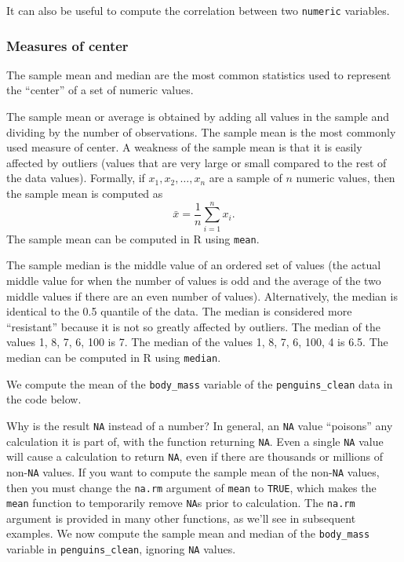 \documentclass[
]{book}
\newenvironment{Shaded}{\begin{snugshade}}{\end{snugshade}}
\newcommand{\DocumentationTok}[1]{\textcolor[rgb]{0.56,0.35,0.01}{\textbf{\textit{#1}}}}
\newcommand{\FunctionTok}[1]{\textcolor[rgb]{0.00,0.00,0.00}{#1}}
\newcommand{\NormalTok}[1]{#1}
\newcommand{\SpecialCharTok}[1]{\textcolor[rgb]{0.00,0.00,0.00}{#1}}
\theoremstyle{definition}
\theoremstyle{definition}
\theoremstyle{definition}
\theoremstyle{definition}
\theoremstyle{remark}
\begin{document}
It can also be useful to compute the correlation between two \texttt{numeric} variables.

\hypertarget{measures-of-center}{%
\subsubsection{Measures of center}\label{measures-of-center}}

The sample mean and median are the most common statistics used to represent the ``center'' of a set of numeric values.

The sample mean or average is obtained by adding all values in the sample and dividing by the number of observations. The sample mean is the most commonly used measure of center. A weakness of the sample mean is that it is easily affected by outliers (values that are very large or small compared to the rest of the data values). Formally, if \(x_1, x_2, \ldots, x_n\) are a sample of \(n\) numeric values, then the sample mean is computed as \[\bar{x} = \frac{1}{n}\sum_{i=1}^n x_i.\] The sample mean can be computed in R using \texttt{mean}.

The sample median is the middle value of an ordered set of values (the actual middle value for when the number of values is odd and the average of the two middle values if there are an even number of values). Alternatively, the median is identical to the 0.5 quantile of the data. The median is considered more ``resistant'' because it is not so greatly affected by outliers. The median of the values 1, 8, 7, 6, 100 is 7. The median of the values 1, 8, 7, 6, 100, 4 is 6.5. The median can be computed in R using \texttt{median}.

We compute the mean of the \texttt{body\_mass} variable of the \texttt{penguins\_clean} data in the code below.

\begin{Shaded}
\end{Shaded}

Why is the result \texttt{NA} instead of a number? In general, an \texttt{NA} value ``poisons'' any calculation it is part of, with the function returning \texttt{NA}. Even a single \texttt{NA} value will cause a calculation to return \texttt{NA}, even if there are thousands or millions of non-\texttt{NA} values. If you want to compute the sample mean of the non-\texttt{NA} values, then you must change the \texttt{na.rm} argument of \texttt{mean} to \texttt{TRUE}, which makes the \texttt{mean} function to temporarily remove \texttt{NA}s prior to calculation. The \texttt{na.rm} argument is provided in many other functions, as we'll see in subsequent examples. We now compute the sample mean and median of the \texttt{body\_mass} variable in \texttt{penguins\_clean}, ignoring \texttt{NA} values.
\end{document}
